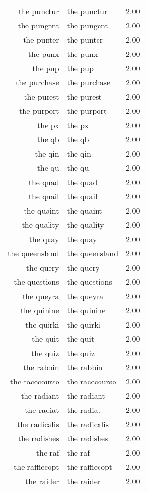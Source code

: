 \begin{table}[ht]
\begin{tabular}{rlr}
  the punctur & the punctur & 2.00 \\ 
  the pungent & the pungent & 2.00 \\ 
  the punter & the punter & 2.00 \\ 
  the punx & the punx & 2.00 \\ 
  the pup & the pup & 2.00 \\ 
  the purchase & the purchase & 2.00 \\ 
  the purest & the purest & 2.00 \\ 
  the purport & the purport & 2.00 \\ 
  the px & the px & 2.00 \\ 
  the qb & the qb & 2.00 \\ 
  the qin & the qin & 2.00 \\ 
  the qu & the qu & 2.00 \\ 
  the quad & the quad & 2.00 \\ 
  the quail & the quail & 2.00 \\ 
  the quaint & the quaint & 2.00 \\ 
  the quality & the quality & 2.00 \\ 
  the quay & the quay & 2.00 \\ 
  the queensland & the queensland & 2.00 \\ 
  the query & the query & 2.00 \\ 
  the questions & the questions & 2.00 \\ 
  the queyra & the queyra & 2.00 \\ 
  the quinine & the quinine & 2.00 \\ 
  the quirki & the quirki & 2.00 \\ 
  the quit & the quit & 2.00 \\ 
  the quiz & the quiz & 2.00 \\ 
  the rabbin & the rabbin & 2.00 \\ 
  the racecourse & the racecourse & 2.00 \\ 
  the radiant & the radiant & 2.00 \\ 
  the radiat & the radiat & 2.00 \\ 
  the radicalis & the radicalis & 2.00 \\ 
  the radishes & the radishes & 2.00 \\ 
  the raf & the raf & 2.00 \\ 
  the rafflecopt & the rafflecopt & 2.00 \\ 
  the raider & the raider & 2.00 \\ 

\end{tabular}
\end{table}
